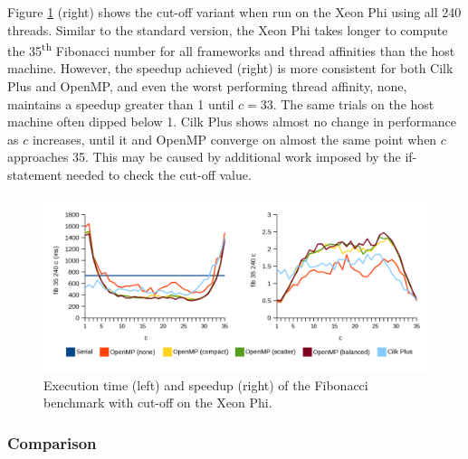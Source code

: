 \documentclass{report}
\begin{document}
Figure \ref{Fig:fibcutoffmic} (right) shows the cut-off variant when run on the Xeon Phi using all 240 threads. Similar to the standard version, the Xeon Phi takes longer to compute the 35\textsuperscript{th} Fibonacci number for all frameworks and thread affinities than the host machine. However, the speedup achieved (right) is more consistent for both Cilk Plus and OpenMP, and even the worst performing thread affinity, none, maintains a speedup greater than 1 until \(c=33\). The same trials on the host machine often dipped below 1. Cilk Plus shows almost no change in performance as \(c\) increases, until it and OpenMP converge on almost the same point when \(c\) approaches 35. This may be caused by additional work imposed by the if-statement needed to check the cut-off value.
\noindent
\begin{figure}[t!]
	\includegraphics[width=\linewidth]{../../charts/mic/fib_cutoff}
	\caption{Execution time (left) and speedup (right) of the Fibonacci benchmark with cut-off on the Xeon Phi.}
	\label{Fig:fibcutoffmic}
\end{figure}

\subsubsection{Comparison}
\end{document}

